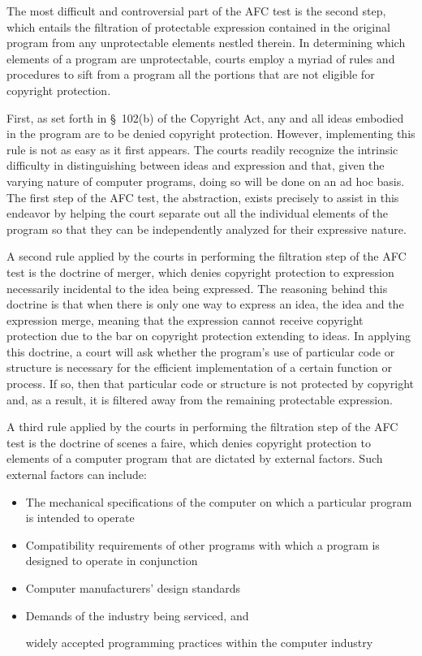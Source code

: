The most difficult and controversial part of the AFC test is the second
step, which entails the filtration of protectable expression contained in
the original program from any unprotectable elements nestled therein. In
determining which elements of a program are unprotectable, courts employ a
myriad of rules and procedures to sift from a program all the portions
that are not eligible for copyright protection.

First, as set forth in \S~102(b) of the Copyright Act, any and all ideas
embodied in the program are to be denied copyright protection. However,
implementing this rule is not as easy as it first appears. The courts
readily recognize the intrinsic difficulty in distinguishing between ideas
and expression and that, given the varying nature of computer programs,
doing so will be done on an ad hoc basis. The first step of the AFC test,
the abstraction, exists precisely to assist in this endeavor by helping
the court separate out all the individual elements of the program so that
they can be independently analyzed for their expressive nature.

A second rule applied by the courts in performing the filtration step of
the AFC test is the doctrine of merger, which denies copyright protection
to expression necessarily incidental to the idea being expressed. The
reasoning behind this doctrine is that when there is only one way to
express an idea, the idea and the expression merge, meaning that the
expression cannot receive copyright protection due to the bar on copyright
protection extending to ideas. In applying this doctrine, a court will ask
whether the program's use of particular code or structure is necessary for
the efficient implementation of a certain function or process. If so, then
that particular code or structure is not protected by copyright and, as a
result, it is filtered away from the remaining protectable expression.

A third rule applied by the courts in performing the filtration step of
the AFC test is the doctrine of scenes a faire, which denies copyright
protection to elements of a computer program that are dictated by external
factors. Such external factors can include:

\begin{itemize}

  \item The mechanical
specifications of the computer on which a particular program is intended
to operate

  \item Compatibility requirements of other programs with which a
program is designed to operate in conjunction

  \item Computer manufacturers'
design standards

  \item Demands of the industry being serviced, and

widely accepted programming practices within the computer industry

\end{itemize}

